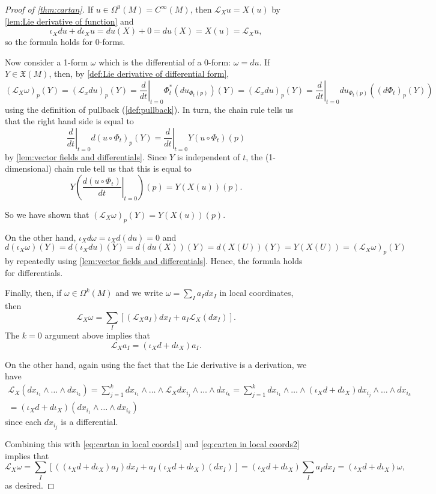 \begin{proof}[Proof of \cref{thm:cartan}]
	If $u \in \Omega^0(M) = C^\infty(M)$, then $\mathcal{L}_Xu = X(u)$ by \cref{lem:Lie derivative of function} and
	\[
		\iota_X du + d\iota_Xu = du(X) + 0 = du(X) = X(u) = \mathcal{L}_Xu ,
	\]
	so the formula holds for 0-forms.
	
	Now consider a 1-form $\omega$ which is the differential of a 0-form: $\omega = du$. If $Y \in \mathfrak{X}(M)$, then, by \cref{def:Lie derivative of differential form},
	\[
		(\mathcal{L}_X\omega)_p(Y) = (\mathcal{L}_xdu)_p(Y) = \left. \frac{d}{dt} \right|_{t=0} \Phi_t^\ast(du_{\Phi_t(p)})(Y) = (\mathcal{L}_xdu)_p(Y) = \left. \frac{d}{dt} \right|_{t=0} du_{\Phi_t(p)}((d\Phi_t)_p(Y))
	\]
	using the definition of pullback (\cref{def:pullback}). In turn, the chain rule tells us that the right hand side is equal to
	\[
		\left. \frac{d}{dt} \right|_{t=0} d(u \circ\Phi_t)_p(Y) = \left. \frac{d}{dt} \right|_{t=0} Y(u \circ\Phi_t)(p)
	\]
	by \cref{lem:vector fields and differentials}. Since $Y$ is independent of $t$, the (1-dimensional) chain rule tell us that this is equal to
	\[
		Y \left( \left. \frac{d(u \circ \Phi_t)}{dt} \right|_{t=0}\right)(p) = Y(X(u))(p).
	\]
	
	So we have shown that $(\mathcal{L}_X\omega)_p(Y) = Y(X(u))(p)$.
	
	On the other hand, $\iota_X d\omega = \iota_X d(du) = 0$ and
	\[
		d(\iota_X\omega)(Y) = d(\iota_X du)(Y) = d(du(X))(Y) = d(X(U))(Y) = Y(X(U)) = (\mathcal{L}_X\omega)_p(Y)
	\]
	by repeatedly using \cref{lem:vector fields and differentials}. Hence, the formula holds for differentials.
	
	Finally, then, if $\omega \in \Omega^k(M)$ and we write $\omega = \sum_I a_I dx_I$ in local coordinates, then
	\begin{equation}\label{eq:cartan in local coords1}
		\mathcal{L}_X\omega = \sum_I \left[ (\mathcal{L}_X a_I)dx_I + a_I \mathcal{L}_X(dx_I)\right].
	\end{equation}
	The $k=0$ argument above implies that 
	\begin{equation}\label{eq:carten in local coords2}
		\mathcal{L}_X a_I = (\iota_X d + d \iota_X)a_I.
	\end{equation} 
	
	On the other hand, again using the fact that the Lie derivative is a derivation, we have
	\begin{multline*}
		\mathcal{L}_X (dx_{i_1} \wedge \dots \wedge dx_{i_k}) = \sum_{j=1}^k dx_{i_1} \wedge \dots \wedge \mathcal{L}_X dx_{i_j}  \wedge \dots \wedge  dx_{i_k} = \sum_{j=1}^k dx_{i_1} \wedge \dots \wedge (\iota_X d + d \iota_X) dx_{i_j}  \wedge \dots \wedge dx_{i_k} \\
		= (\iota_X d + d \iota_X)(dx_{i_1} \wedge \dots \wedge dx_{i_k})
	\end{multline*}
	since each $dx_{i_j}$ is a differential.
	
	Combining this with \eqref{eq:cartan in local coords1} and \eqref{eq:carten in local coords2} implies that 
	\[
		\mathcal{L}_X\omega = \sum_I \left[ ((\iota_X d + d \iota_X) a_I)dx_I + a_I (\iota_X d + d \iota_X)(dx_I)\right] = (\iota_X d + d \iota_X)\sum_I a_I dx_I = (\iota_X d + d \iota_X)\omega,
	\]
	as desired.
\end{proof}